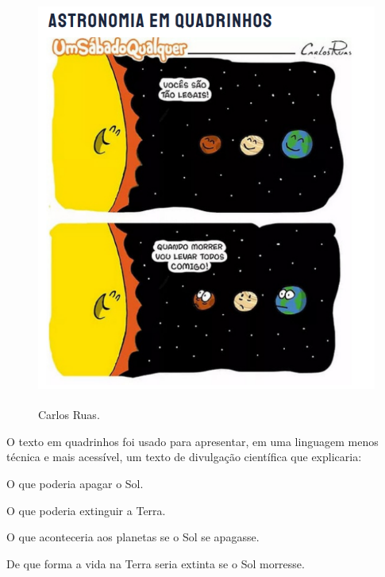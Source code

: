 \begin{figure}[H]
\centering\includegraphics[width=4.75833in,height=5.41291in]{./imgSAEB_6_POR/media/image12.png}
\caption{Carlos Ruas.}
\end{figure}

\noindent O texto em quadrinhos foi usado para apresentar, em uma linguagem menos
técnica e mais acessível, um texto de divulgação científica que
explicaria:

\begin{escolha}
\item O que poderia apagar o Sol.
\item O que poderia extinguir a Terra.
\item O que aconteceria aos planetas se o Sol se apagasse.
\item De que forma a vida na Terra seria extinta se o Sol morresse.
\end{escolha}



